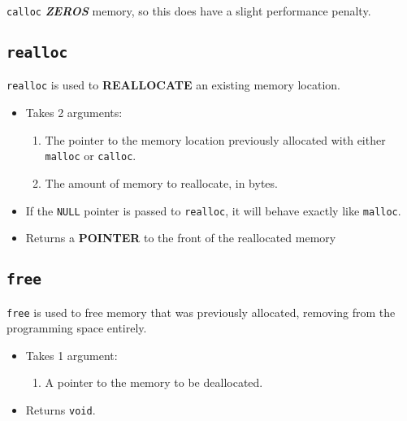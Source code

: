 \texttt{calloc} {\large{\textbf{\emph{ZEROS}}}} memory, so this does have a slight performance penalty.

\subsection{\texttt{realloc}}\label{subsec:realloc}
\texttt{realloc} is used to \textbf{REALLOCATE} an existing memory location.
\begin{itemize}
\item Takes 2 arguments:
  \begin{enumerate}
  \item The pointer to the memory location previously allocated with either \texttt{malloc} or \texttt{calloc}.
  \item The amount of memory to reallocate, in bytes.
  \end{enumerate}
\item If the \texttt{NULL} pointer is passed to \texttt{realloc}, it will behave exactly like \texttt{malloc}.
\item Returns a \textbf{POINTER} to the front of the reallocated memory
\end{itemize}

\subsection{\texttt{free}}\label{subsec:free}
\texttt{free} is used to free memory that was previously allocated, removing from the programming space entirely.
\begin{itemize}
\item Takes 1 argument:
  \begin{enumerate}
  \item A pointer to the memory to be deallocated.
  \end{enumerate}
\item Returns \texttt{void}.
\end{itemize}


